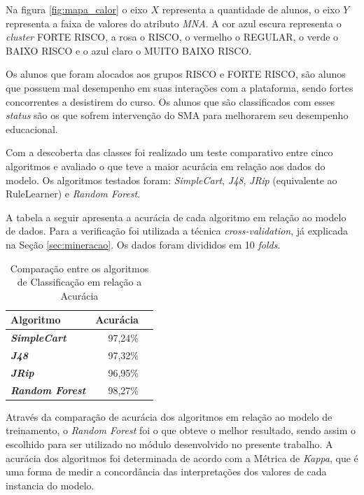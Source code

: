 Na figura \ref{fig:mapa_calor} o eixo $X$ representa a quantidade de alunos, o eixo $Y$ representa a faixa de valores do atributo \textit{MNA}. A cor azul escura representa o \textit{cluster} FORTE RISCO, a rosa o RISCO, o vermelho o REGULAR, o verde o BAIXO RISCO e o azul claro o MUITO BAIXO RISCO. 

Os alunos que foram alocados aos grupos RISCO e FORTE RISCO, são alunos que possuem mal desempenho em suas interações com a plataforma, sendo fortes concorrentes a desistirem do curso. Os alunos que são classificados com esses \textit{status} são os que sofrem intervenção do SMA para melhorarem seu desempenho educacional.

Com a descoberta das classes foi realizado um teste comparativo entre cinco algoritmos e avaliado o que teve a maior acurácia em relação aos dados do modelo. Os algoritmos testados foram: \textit{SimpleCart}, \textit{J48}, \textit{JRip} (equivalente ao RuleLearner) e \textit{Random Forest}.

A tabela a seguir apresenta a acurácia de cada algoritmo em relação ao modelo de dados. Para a verificação foi utilizada a técnica \textit{cross-validation}, já explicada na Seção \ref{sec:mineracao}. Os dados foram divididos em 10 \textit{folds}.

\begin{table}[!ht]
\centering
\caption{Comparação entre os algoritmos de Classificação em relação a Acurácia}
\vspace{0.5cm}
\begin{tabular}{l|r|r|}
 
Algoritmo & Acurácia\\
\hline
\textbf{\textit{SimpleCart}} & 97,24\%\\
\textbf{\textit{J48}} & 97,32\%\\
\textbf{\textit{JRip}} & 96,95\%\\
\textbf{\textit{Random Forest}} & 98,27\%
\end{tabular}
\label{tab:comparacao_algoritmos}
\end{table}

Através da comparação de acurácia dos algoritmos em relação ao modelo de treinamento, o \textit{Random Forest} foi o que obteve o melhor resultado, sendo assim o escolhido para ser utilizado no módulo desenvolvido no presente trabalho. A acurácia dos algoritmos foi determinada de acordo com a Métrica de \textit{Kappa}, que é uma forma de medir a concordância das interpretações dos valores de cada instancia do modelo.


